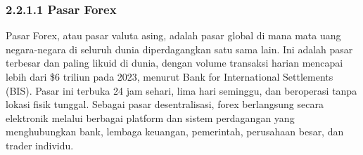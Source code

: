 \subsubsection*{2.2.1.1 Pasar Forex}
Pasar Forex, atau pasar valuta asing, adalah pasar global di mana mata uang negara-negara di seluruh dunia diperdagangkan satu sama lain. Ini adalah pasar terbesar dan paling likuid di dunia, dengan volume transaksi harian mencapai lebih dari \$6 triliun pada 2023, menurut Bank for International Settlements (BIS)\autocite{bis2023triennial}. Pasar ini terbuka 24 jam sehari, lima hari seminggu, dan beroperasi tanpa lokasi fisik tunggal\autocite{hull2015options}. Sebagai pasar desentralisasi, forex berlangsung secara elektronik melalui berbagai platform dan sistem perdagangan yang menghubungkan bank, lembaga keuangan, pemerintah, perusahaan besar, dan trader individu.

